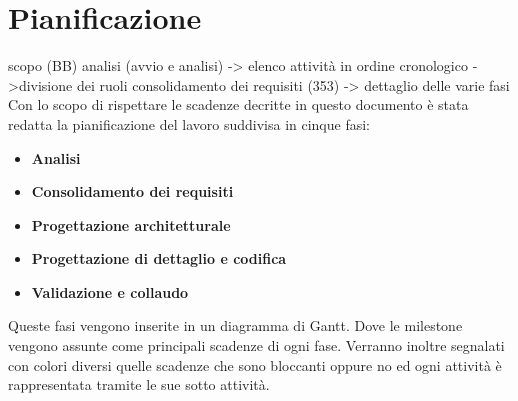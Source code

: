\section{Pianificazione}
	scopo (BB)
	analisi (avvio e analisi)
		-> elenco attività in ordine cronologico
		->divisione dei ruoli
	consolidamento dei requisiti (353)
	-> dettaglio delle varie fasi
	\newline
	Con lo scopo di rispettare le scadenze decritte in questo documento è stata redatta la pianificazione del lavoro suddivisa in cinque fasi:
	\begin{itemize}
		\item{\textbf{Analisi}}
		\item{\textbf{Consolidamento  dei requisiti}}
		\item{\textbf{Progettazione architetturale}}
		\item{\textbf{Progettazione di dettaglio e codifica}}
		\item{\textbf{Validazione e collaudo}}
	\end{itemize}
	Queste fasi vengono inserite in un diagramma di Gantt. Dove le milestone vengono assunte come principali scadenze di ogni fase. Verranno inoltre segnalati con colori diversi quelle scadenze che sono bloccanti oppure no ed  ogni attività è rappresentata tramite le sue sotto attività.